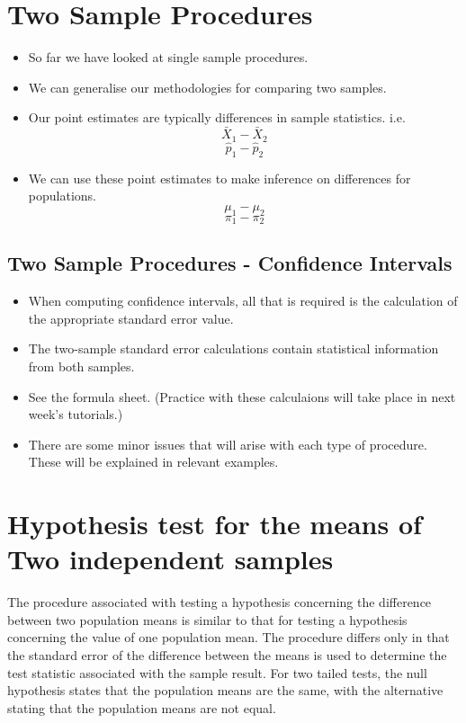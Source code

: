 \documentclass[]{report}
\begin{document}
\section{Two Sample Procedures}
\begin{itemize}
\item So far we have looked at single sample procedures.
\item We can generalise our methodologies for comparing two samples.
\item Our point estimates are typically differences in sample statistics. i.e.
\[ \bar{X}_1 - \bar{X}_2\]
\[\hat{p}_1 - \hat{p}_2 \]
\item We can use these point estimates to make inference on differences for populations.
\[ \mu_1 - \mu_2\]
\[ \pi_1 - \pi_2 \]
\end{itemize}


\subsection*{Two Sample Procedures - Confidence Intervals}
\begin{itemize}
\item When computing confidence intervals, all that is required is the calculation of the appropriate standard error value.
\item The two-sample standard error calculations contain statistical information from both samples.
\item See the formula sheet. (Practice with these calculaions will take place in next week's tutorials.)
\item There are some minor issues that will arise with each type of procedure. These will be explained in relevant examples.
\end{itemize}



\section{Hypothesis test for the means of Two independent samples}
The procedure associated with testing a hypothesis concerning the difference between two population means is similar to that for testing a hypothesis concerning the value of one population mean. The procedure differs only in that the standard error of the difference between the means is used to determine the test statistic associated with the sample result. For two tailed tests, the null hypothesis states that the population means are the same, with the alternative stating that the population means are not equal.
\end{document}
